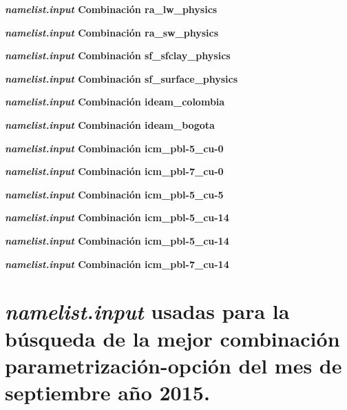 \textbf{\textit{namelist.input}  Combinación ra\_lw\_physics}



\textbf{\textit{namelist.input}  Combinación ra\_sw\_physics}



\textbf{\textit{namelist.input}  Combinación sf\_sfclay\_physics}



\textbf{\textit{namelist.input}  Combinación sf\_surface\_physics}



\textbf{\textit{namelist.input}  Combinación ideam\_colombia}



\textbf{\textit{namelist.input}  Combinación ideam\_bogota}



\textbf{\textit{namelist.input}  Combinación icm\_pbl-5\_cu-0}



\textbf{\textit{namelist.input}  Combinación icm\_pbl-7\_cu-0}



\textbf{\textit{namelist.input}  Combinación icm\_pbl-5\_cu-5}



\textbf{\textit{namelist.input}  Combinación icm\_pbl-5\_cu-14}



\textbf{\textit{namelist.input}  Combinación icm\_pbl-5\_cu-14}



\textbf{\textit{namelist.input}  Combinación icm\_pbl-7\_cu-14}



\section{\textit{namelist.input} usadas para la búsqueda de la mejor combinación parametrización-opción del mes de septiembre año 2015.}


